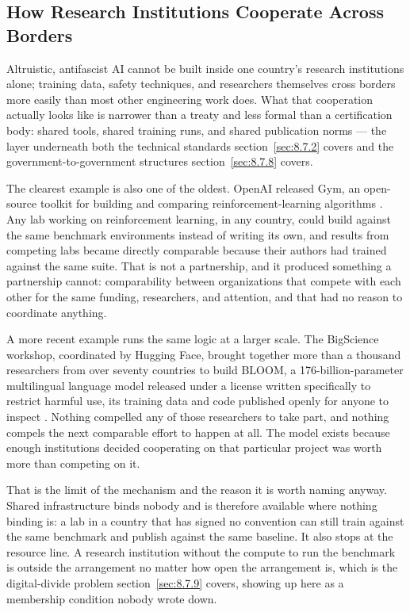 \subsection{How Research Institutions Cooperate Across Borders}
\label{sec:8.7.1}
Altruistic, antifascist AI cannot be built inside one country's research institutions alone; training data, safety techniques, and researchers themselves cross borders more easily than most other engineering work does. What that cooperation actually looks like is narrower than a treaty and less formal than a certification body: shared tools, shared training runs, and shared publication norms — the layer underneath both the technical standards section~\ref{sec:8.7.2} covers and the government-to-government structures section~\ref{sec:8.7.8} covers.

The clearest example is also one of the oldest. OpenAI released Gym, an open-source toolkit for building and comparing reinforcement-learning algorithms \autocite{brockman2016gym}. Any lab working on reinforcement learning, in any country, could build against the same benchmark environments instead of writing its own, and results from competing labs became directly comparable because their authors had trained against the same suite. That is not a partnership, and it produced something a partnership cannot: comparability between organizations that compete with each other for the same funding, researchers, and attention, and that had no reason to coordinate anything.

A more recent example runs the same logic at a larger scale. The BigScience workshop, coordinated by Hugging Face, brought together more than a thousand researchers from over seventy countries to build BLOOM, a 176-billion-parameter multilingual language model released under a license written specifically to restrict harmful use, its training data and code published openly for anyone to inspect \autocite{bigscience2022bloom}. Nothing compelled any of those researchers to take part, and nothing compels the next comparable effort to happen at all. The model exists because enough institutions decided cooperating on that particular project was worth more than competing on it.

That is the limit of the mechanism and the reason it is worth naming anyway. Shared infrastructure binds nobody and is therefore available where nothing binding is: a lab in a country that has signed no convention can still train against the same benchmark and publish against the same baseline. It also stops at the resource line. A research institution without the compute to run the benchmark is outside the arrangement no matter how open the arrangement is, which is the digital-divide problem section~\ref{sec:8.7.9} covers, showing up here as a membership condition nobody wrote down.
